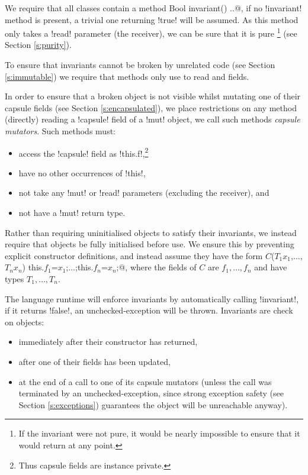 We require that all classes contain a \Q@read method Bool invariant() {..}@, if no \Q!invariant! method is present, a trivial one returning \Q!true! will be assumed. As this method only takes a \Q!read! parameter (the receiver), we can be sure that it is pure \footnote{If the invariant were not pure, it would be nearly impossible to ensure that it would return \Q@true@ at any point.} (see Section \ref{s:purity}).

To ensure that invariants cannot be broken by unrelated code (see Section \ref{s:immutable}) we require that \Q@invariant@ methods only use \Q@this@ to read \Q@imm@ and \Q@capsule@ fields.

In order to ensure that a broken object is not visible whilst mutating one of their capsule fields (see Section \ref{s:encapsulated}), we place restrictions on any method (directly) reading a \Q!capsule! field of a \Q!mut! object, we call such methods \emph{capsule mutators}. Such methods must:
\begin{itemize}
\item access the \Q!capsule! field as \Q!this.f!,\footnote{Thus capsule fields are instance private.}
\item have no other occurrences of \Q!this!,
\item not take any \Q!mut! or \Q!read! parameters (excluding the receiver), and
\item not have a \Q!mut! return type.
\end{itemize}
%
Rather than requiring uninitialised objects to satisfy their invariants, we instead require that objects be fully initialised before use. We ensure this by preventing explicit constructor definitions, and instead assume they have the form \Q@$C$($T_1 x_1$,$\ldots$,$T_n x_n$) {this.$f_1$=$x_1$;$\ldots$;this.$f_n$=$x_n$;}@, where the fields of $C$ are $f_1,\ldots,f_n$ and have types $T_1,\ldots,T_n$.

The language runtime will enforce invariants by automatically calling \Q!invariant!, if it returns \Q!false!, an unchecked-exception will be thrown. Invariants are check on objects:
\begin{itemize}
	\item immediately after their constructor has returned,
	\item after one of their fields has been updated,
	\item at the end of a call to one of its capsule mutators (unless the call was terminated by an unchecked-exception, since strong exception safety (see Section \ref{s:exceptions}) guarantees the object will be unreachable anyway).
\end{itemize}

